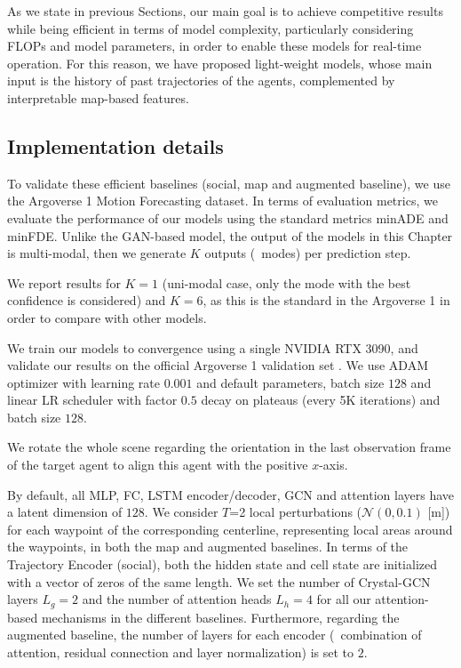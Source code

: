 As we state in previous Sections, our main goal is to achieve competitive results while being efficient in terms of model complexity, particularly considering \acfp{FLOP} and model parameters, in order to enable these models for real-time operation. For this reason, we have proposed light-weight models, whose main input is the history of past trajectories of the agents, complemented by interpretable map-based features. 

\subsection{Implementation details}
\label{subsec:6_implementation_details}

To validate these efficient baselines (social, map and augmented baseline), we use the Argoverse 1 Motion Forecasting dataset. In terms of evaluation metrics, we evaluate the performance of our models using the standard metrics \ac{minADE} and \ac{minFDE}. Unlike the \ac{GAN}-based model, the output of the models in this Chapter is multi-modal, then we generate $K$ outputs (\aka \ modes) per prediction step.

We report results for $K=1$ (uni-modal case, only the mode with the best confidence is considered) and $K=6$, as this is the standard in the Argoverse 1 in order to compare with other models.

We train our models to convergence using a single NVIDIA RTX 3090, and validate our results on the official Argoverse 1 validation set \cite{chang2019argoverse}. We use \ac{ADAM} optimizer with learning rate $0.001$ and default parameters, batch size $128$ and linear \ac{LR} scheduler with factor $0.5$ decay on plateaus (every 5K iterations) and batch size $128$.

We rotate the whole scene regarding the orientation in the last observation frame of the target agent to align this agent with the positive $x$-axis.

By default, all \ac{MLP}, \ac{FC}, \ac{LSTM} encoder/decoder, \ac{GCN} and attention layers have a latent dimension of $128$. We consider $T$=2 local perturbations ($\mathcal{N}(0, 0.1)$ [m]) for each waypoint of the corresponding centerline, representing local areas around the waypoints, in both the map and augmented baselines. In terms of the Trajectory Encoder (social), both the hidden state and cell state are initialized with a vector of zeros of the same length. We set the number of Crystal-\ac{GCN} layers $L_g=2$ and the number of attention heads $L_h=4$ for all our attention-based mechanisms in the different baselines. Furthermore, regarding the augmented baseline, the number of layers for each encoder (\ie \ combination of attention, residual connection and layer normalization) is set to $2$.

